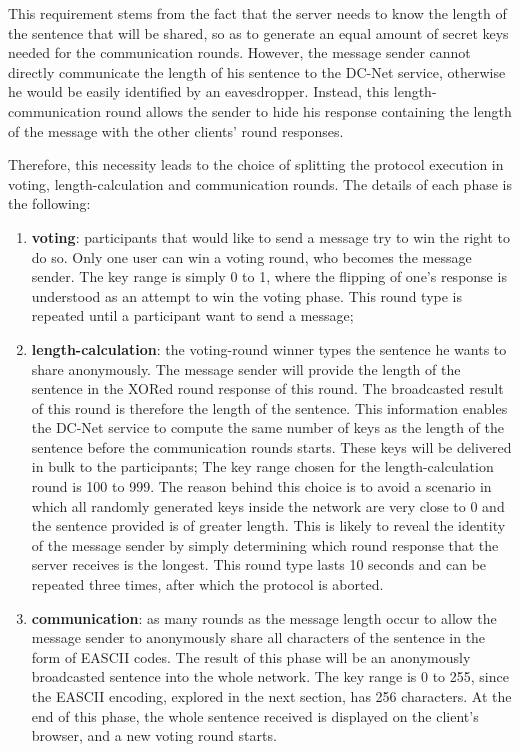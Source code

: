 This requirement stems from the fact that the server needs to know the length of the sentence that will be shared, so as to generate an equal amount of secret keys needed for the communication rounds. However, the message sender cannot directly communicate the length of his sentence to the DC-Net service, otherwise he would be easily identified by an eavesdropper. Instead, this length-communication round allows the sender to hide his response containing the length of the message with the other clients' round responses.

Therefore, this necessity leads to the choice of splitting the protocol execution in voting, length-calculation and communication rounds. 
The details of each phase is the following:
\begin{enumerate}
    \item \textbf{voting}: participants that would like to send a message try to win the right to do so. Only one user can win a voting round, who becomes the message sender. The key range is simply 0 to 1, where the flipping of one's response is understood as an attempt to win the voting phase. This round type is repeated until a participant want to send a message;
    \item \textbf{length-calculation}: the voting-round winner types the sentence he wants to share anonymously. The message sender will provide the length of the sentence in the XORed round response of this round. The broadcasted result of this round is therefore the length of the sentence. This information enables the DC-Net service to compute the same number of keys as the length of the sentence before the communication rounds starts. These keys will be delivered in bulk to the participants; The key range chosen for the length-calculation round is 100 to 999. The reason behind this choice is to avoid a scenario in which all randomly generated keys inside the network are very close to 0 and the sentence provided is of greater length. This is likely to reveal the identity of the message sender by simply determining which round response that the server receives is the longest. This round type lasts 10 seconds and can be repeated three times, after which the protocol is aborted.
    \item \textbf{communication}: as many rounds as the message length occur to allow the message sender to anonymously share all characters of the sentence in the form of EASCII codes. The result of this phase will be an anonymously broadcasted sentence into the whole network. The key range is 0 to 255, since the EASCII encoding, explored in the next section, has 256 characters. At the end of this phase, the whole sentence received is displayed on the client's browser, and a new voting round starts.
\end{enumerate}


